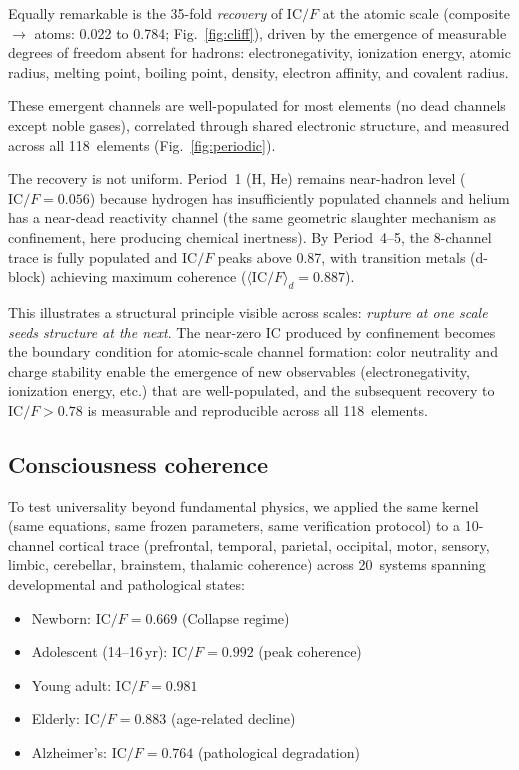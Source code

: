 \documentclass[11pt]{article}
\newcommand{\IC}{\mathrm{IC}}
\begin{document}
Equally remarkable is the 35-fold \emph{recovery} of $\IC/F$ at
the atomic scale (composite $\to$ atoms: 0.022 to 0.784;
Fig.~\ref{fig:cliff}), driven by the emergence of measurable
degrees of freedom absent for hadrons: electronegativity,
ionization energy, atomic radius, melting point, boiling point,
density, electron affinity, and covalent radius.

These emergent channels are well-populated for most elements (no
dead channels except noble gases), correlated through shared
electronic structure, and measured across all 118~elements
(Fig.~\ref{fig:periodic}).

The recovery is not uniform. Period~1 (H, He) remains
near-hadron level ($\IC/F = 0.056$) because hydrogen has
insufficiently populated channels and helium has a near-dead
reactivity channel (the same geometric slaughter mechanism as
confinement, here producing chemical inertness). By Period~4--5, the 8-channel trace
is fully populated and $\IC/F$ peaks above 0.87, with transition
metals (d-block) achieving maximum coherence ($\langle\IC/F\rangle_d
= 0.887$).

This illustrates a structural principle visible across scales:
\emph{rupture at one scale seeds structure at the next}.
The near-zero $\IC$ produced by confinement becomes the boundary
condition for atomic-scale channel formation: color neutrality
and charge stability enable the emergence of new observables
(electronegativity, ionization energy, etc.) that are well-populated,
and the subsequent recovery to $\IC/F > 0.78$ is measurable and
reproducible across all 118~elements.

\subsection{Consciousness coherence}

To test universality beyond fundamental physics, we applied the
same kernel (same equations, same frozen parameters, same
verification protocol) to a 10-channel cortical trace
(prefrontal, temporal, parietal, occipital, motor, sensory, limbic,
cerebellar, brainstem, thalamic coherence) across 20~systems spanning
developmental and pathological states:

\begin{itemize}[leftmargin=1.5em,itemsep=1pt]
\item Newborn: $\IC/F = 0.669$ (Collapse regime)
\item Adolescent (14--16\,yr): $\IC/F = 0.992$ (peak coherence)
\item Young adult: $\IC/F = 0.981$
\item Elderly: $\IC/F = 0.883$ (age-related decline)
\item Alzheimer's: $\IC/F = 0.764$ (pathological degradation)
\end{itemize}
\end{document}
